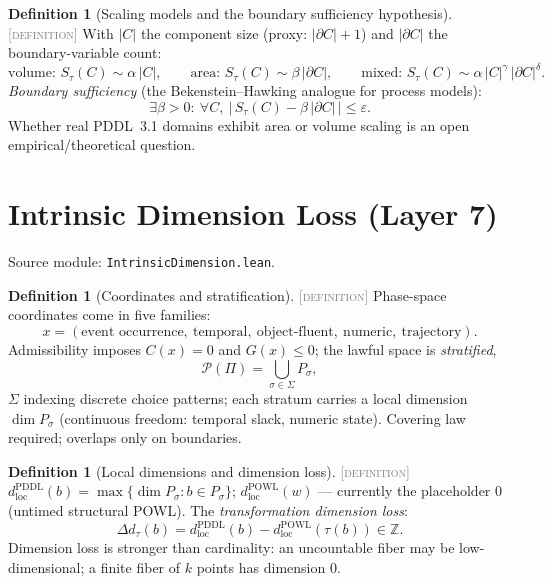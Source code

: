 \documentclass[11pt]{article}
\newcommand{\DEFINITION}{\textcolor{gray}{\textsc{[definition]}}}
\newcommand{\PT}{\Pi}                          %
\newcommand{\PS}{\mathcal{P}(\PT)}             %
\newcommand{\tmap}{\tau}                       %
\theoremstyle{plain}
\theoremstyle{definition}
\newtheorem{definition}[theorem]{Definition}
\begin{document}
\begin{definition}[Scaling models and the boundary sufficiency hypothesis]
\DEFINITION\;
With $|C|$ the component size (proxy: $|\partial C| + 1$) and $|\partial C|$
the boundary-variable count:
\[
  \text{volume: } S_\tmap(C) \sim \alpha\,|C|,
  \qquad
  \text{area: } S_\tmap(C) \sim \beta\,|\partial C|,
  \qquad
  \text{mixed: } S_\tmap(C) \sim \alpha\,|C|^{\gamma}\,|\partial C|^{\delta}.
\]
\emph{Boundary sufficiency} (the Bekenstein--Hawking analogue for process
models):
\[
  \exists \beta > 0:\ \forall C,\
  \big|\,S_\tmap(C) - \beta\,|\partial C|\,\big| \le \varepsilon .
\]
Whether real PDDL~3.1 domains exhibit area or volume scaling is an open
empirical/theoretical question.
\end{definition}

\section{Intrinsic Dimension Loss (Layer 7)}
\label{sec:dimension}
Source module: \texttt{IntrinsicDimension.lean}.

\begin{definition}[Coordinates and stratification]\DEFINITION\;
Phase-space coordinates come in five families:
\[
  x = (\text{event occurrence},\ \text{temporal},\ \text{object-fluent},\
       \text{numeric},\ \text{trajectory}).
\]
Admissibility imposes $C(x) = 0$ and $G(x) \le 0$; the lawful space is
\emph{stratified},
\[
  \PS = \bigcup_{\sigma \in \Sigma} P_\sigma ,
\]
$\Sigma$ indexing discrete choice patterns; each stratum carries a local
dimension $\dim P_\sigma$ (continuous freedom: temporal slack, numeric
state). Covering law required; overlaps only on boundaries.
\end{definition}

\begin{definition}[Local dimensions and dimension loss]\DEFINITION\;
$d^{\mathrm{PDDL}}_{\mathrm{loc}}(b) = \max\{\dim P_\sigma : b \in P_\sigma\}$;
$d^{\mathrm{POWL}}_{\mathrm{loc}}(w)$ --- currently the placeholder $0$
(untimed structural POWL). The \emph{transformation dimension loss}:
\[
  \Delta d_\tmap(b)
  = d^{\mathrm{PDDL}}_{\mathrm{loc}}(b) - d^{\mathrm{POWL}}_{\mathrm{loc}}(\tmap(b))
  \in \mathbb{Z}.
\]
Dimension loss is stronger than cardinality: an uncountable fiber may be
low-dimensional; a finite fiber of $k$ points has dimension $0$.
\end{definition}
\end{document}
